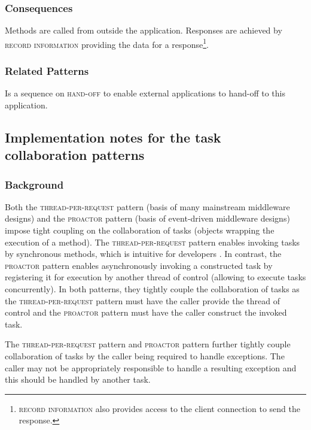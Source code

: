\documentclass[prodmode]{style/acmlarge}
\begin{document}
\subsubsection*{Consequences} Methods are called from outside the application. 
Responses are achieved by \textsc{record information} providing the data for a
response\footnote{\textsc{record information} also provides access to the client
connection to send the response.}.

\subsubsection*{Related Patterns} Is a sequence on \textsc{hand-off} to enable
external applications to hand-off to this application.



\subsection{\textbf{Implementation notes for the task collaboration patterns}}

\subsubsection*{Background}

Both the \textsc{thread-per-request} pattern \cite{thread-per-request} (basis of
many mainstream middleware designs) and the \textsc{proactor} pattern
\cite{proactor} (basis of event-driven middleware designs) impose tight
coupling on the collaboration of tasks (objects wrapping the execution of a
method).  The \textsc{thread-per-request} pattern enables invoking tasks by
synchronous methods, which is intuitive for developers \cite{proactor}.
In contrast, the \textsc{proactor} pattern enables asynchronously invoking a
constructed task by registering it for execution by another thread of control
(allowing to execute tasks concurrently).  In both patterns, they tightly couple
the collaboration of tasks as the \textsc{thread-per-request} pattern must have
the caller provide the thread of control and the \textsc{proactor} pattern must
have the caller construct the invoked task.

The \textsc{thread-per-request} pattern and \textsc{proactor} pattern further
tightly couple collaboration of tasks by the caller being required to handle
exceptions.  The caller may not be appropriately responsible to handle a
resulting exception and this should be handled by another task.
\end{document}
